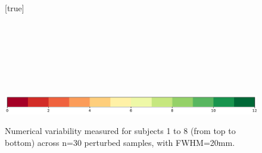 \documentclass[lettersize,journal]{IEEEtran}
\newcommand{\fmriprep}{fMRIPrep\xspace}
\begin{document}
\begin{landscape}
  \begin{figure}
    \vspace*{-2cm}
    \centering
    [true] \\
     \\
     \\
     \\
     \\
     \\
     \\
     \\
    \includegraphics*[width=.7\linewidth]{figures/colorbar_sigbit_discrete.pdf}
    \caption{Numerical variability measured for subjects 1 to 8 (from top to bottom) across n=30 perturbed samples, with FWHM=20mm. }
    \label{fig:uncertainty-maps-20mm-disc}
  \end{figure}
\end{landscape}




\end{document}
